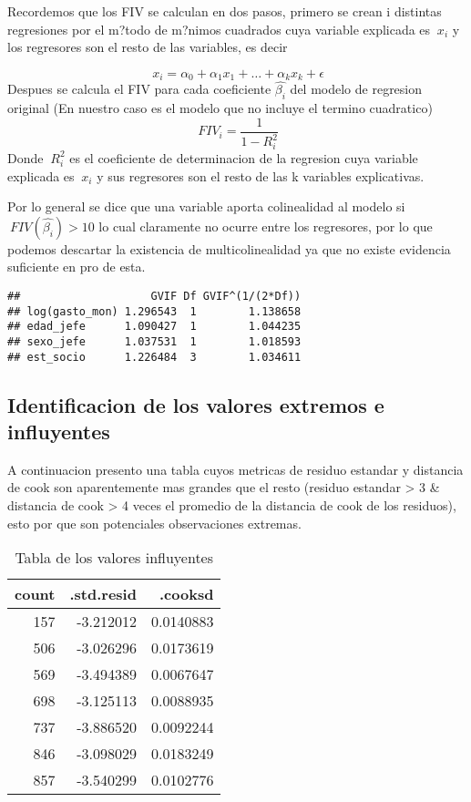\documentclass[]{book}
\begin{document}
Recordemos que los FIV se calculan en dos pasos, primero se crean i
distintas regresiones por el m?todo de m?nimos cuadrados cuya variable
explicada es \(\ x_{i}\) y los regresores son el resto de las variables,
es decir

\[ \ x_{i} = \alpha_{0} + \alpha_{1}x_{1} + \dots + \alpha_{k}x_{k} + \epsilon \]
Despues se calcula el FIV para cada coeficiente \(\hat{\beta_{i}}\) del
modelo de regresion original (En nuestro caso es el modelo que no
incluye el termino cuadratico) \[ \ FIV_{i} = \frac{1}{1-R^{2}_{i}} \]
Donde \(\ R_{i}^{2}\) es el coeficiente de determinacion de la regresion
cuya variable explicada es \(\ x_{i}\) y sus regresores son el resto de
las k variables explicativas.

Por lo general se dice que una variable aporta colinealidad al modelo si
\(\ FIV(\hat{\beta_{i}}) > 10\) lo cual claramente no ocurre entre los
regresores, por lo que podemos descartar la existencia de
multicolinealidad ya que no existe evidencia suficiente en pro de esta.

\begin{verbatim}
##                    GVIF Df GVIF^(1/(2*Df))
## log(gasto_mon) 1.296543  1        1.138658
## edad_jefe      1.090427  1        1.044235
## sexo_jefe      1.037531  1        1.018593
## est_socio      1.226484  3        1.034611
\end{verbatim}

\subsection{Identificacion de los valores extremos e
influyentes}\label{identificacion-de-los-valores-extremos-e-influyentes}

A continuacion presento una tabla cuyos metricas de residuo estandar y
distancia de cook son aparentemente mas grandes que el resto (residuo
estandar \textgreater{} 3 \& distancia de cook \textgreater{} 4 veces el
promedio de la distancia de cook de los residuos), esto por que son
potenciales observaciones extremas.

\begin{table}

\caption{\label{tab:unnamed-chunk-44}Tabla de los valores influyentes}
\centering
\begin{tabular}[t]{r|r|r}
\hline
count & .std.resid & .cooksd\\
\hline
157 & -3.212012 & 0.0140883\\
\hline
506 & -3.026296 & 0.0173619\\
\hline
569 & -3.494389 & 0.0067647\\
\hline
698 & -3.125113 & 0.0088935\\
\hline
737 & -3.886520 & 0.0092244\\
\hline
846 & -3.098029 & 0.0183249\\
\hline
857 & -3.540299 & 0.0102776\\
\hline
\end{tabular}
\end{table}
\end{document}
